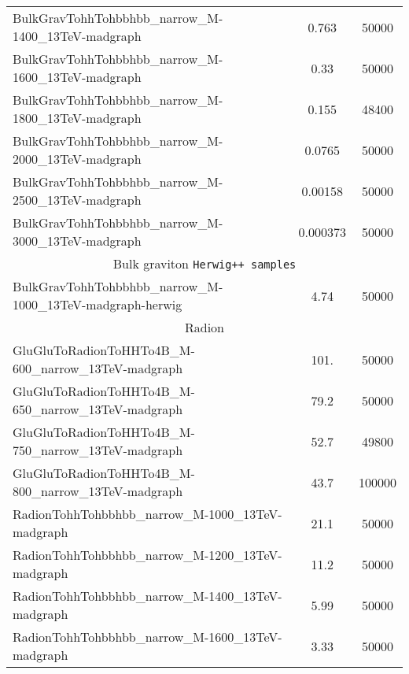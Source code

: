 \begin{table}[htb]
\begin{center}
\begin{tabular}{l|c|c}
      {BulkGravTohhTohbbhbb\_narrow\_M-1400\_13TeV-madgraph} & 0.763 & 50000 \\
      {BulkGravTohhTohbbhbb\_narrow\_M-1600\_13TeV-madgraph} & 0.33 & 50000 \\
      {BulkGravTohhTohbbhbb\_narrow\_M-1800\_13TeV-madgraph} & 0.155 & 48400 \\
      {BulkGravTohhTohbbhbb\_narrow\_M-2000\_13TeV-madgraph} & 0.0765 & 50000 \\
      {BulkGravTohhTohbbhbb\_narrow\_M-2500\_13TeV-madgraph} & 0.00158 & 50000 \\
      {BulkGravTohhTohbbhbb\_narrow\_M-3000\_13TeV-madgraph} & 0.000373 & 50000 \\
      \hline
      \multicolumn{3}{c}{Bulk graviton \texttt{Herwig++ samples}} \\ \cline{1-3}
      {BulkGravTohhTohbbhbb\_narrow\_M-1000\_13TeV-madgraph-herwig} & 4.74  & 50000 \\
      \hline
      \multicolumn{3}{c}{Radion} \\ \cline{1-3}
      \hline
      {GluGluToRadionToHHTo4B\_M-600\_narrow\_13TeV-madgraph} & 101. & 50000 \\
      {GluGluToRadionToHHTo4B\_M-650\_narrow\_13TeV-madgraph} & 79.2 & 50000 \\
      {GluGluToRadionToHHTo4B\_M-750\_narrow\_13TeV-madgraph} & 52.7 & 49800 \\
      {GluGluToRadionToHHTo4B\_M-800\_narrow\_13TeV-madgraph} & 43.7 & 100000 \\
      {RadionTohhTohbbhbb\_narrow\_M-1000\_13TeV-madgraph} & 21.1  & 50000 \\
      {RadionTohhTohbbhbb\_narrow\_M-1200\_13TeV-madgraph} & 11.2 & 50000 \\
      {RadionTohhTohbbhbb\_narrow\_M-1400\_13TeV-madgraph} & 5.99 & 50000 \\
      {RadionTohhTohbbhbb\_narrow\_M-1600\_13TeV-madgraph} & 3.33 & 50000 \\

\end{tabular}
\end{center}
\end{table}
